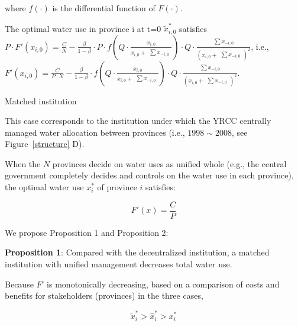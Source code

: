 \begin{case}
    where $f(\cdot)$ is the differential function of $F(\cdot)$.

    The optimal water use in province i at t=0 $\widetilde x_{i,0}^*$ satisfies $P \cdot F'(x_{i,0})=\frac{C}{N}-\frac{\beta}{1-\beta} \cdot P \cdot f(Q \cdot \frac{x_{i,0}}{x_{i,0} + \begin{matrix} \sum x_{-i,0} \end{matrix}}) \cdot Q \cdot \frac{\begin{matrix} \sum x_{-i,0} \end{matrix}}{(x_{i,0} + \begin{matrix} \sum x_{-i,0} \end{matrix})^2}$, i.e., $F'(x_{i,0})=\frac{C}{P \cdot N} - \frac{\beta}{1-\beta} \cdot f(Q \cdot \frac{x_{i,0}}{x_{i,0} + \begin{matrix} \sum x_{-i,0} \end{matrix}}) \cdot Q \cdot \frac{\begin{matrix} \sum x_{-i,0} \end{matrix}}{(x_{i,0} + \begin{matrix} \sum x_{-i,0} \end{matrix})^2}$.

\end{case}

\begin{case} Matched institution

    This case corresponds to the institution under which the YRCC centrally managed water allocation between provinces (i.e., $1998\sim2008$, see Figure~\ref{structure} D).

    When the $N$ provinces decide on water uses as unified whole (e.g., the central government completely decides and controls on the water use in each province), the optimal water use $x_i^*$ of province $i$ satisfies:

    $$F'(x)=\frac{C}{P}$$

\end{case}

We propose Proposition 1 and Proposition 2:

\textbf{Proposition 1}: Compared with the decentralized institution, a matched institution with unified management decreases total water use.

Because $F’$ is monotonically decreasing, based on a comparison of costs and benefits for stakeholders (provinces) in the three cases,

$$\widetilde x_i^*>\hat x_i^*>x_i^*$$

